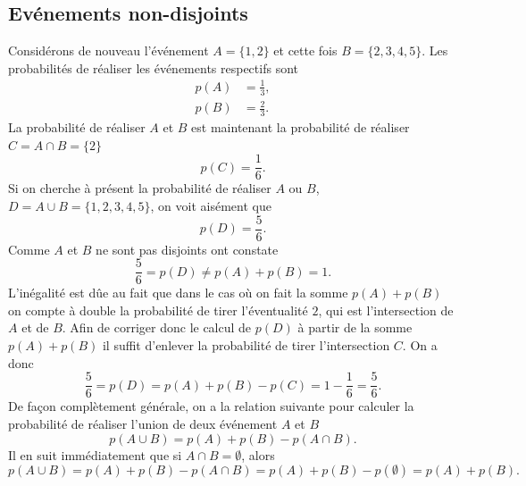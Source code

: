 \documentclass[a4paper,12pt]{book}
\begin{document}
\subsection{Evénements non-disjoints}
Considérons de nouveau l'événement $A=\{1,2\}$ et cette fois $B=\{2,3,4,5\}$. Les probabilités de réaliser les événements
respectifs sont
\begin{align}
 p(A)&=\frac{1}{3},\\
 p(B)&=\frac{2}{3}.
\end{align}
La probabilité de réaliser $A$ et $B$ est maintenant la probabilité de réaliser $C=A\cap B=\{2\}$ 
\begin{equation}
 p(C)=\frac{1}{6}.
\end{equation}
Si on cherche à présent la probabilité de réaliser $A$ ou $B$, $D=A\cup B=\{1,2,3,4,5\}$, on voit aisément que 
\begin{equation}
 p(D)=\frac{5}{6}.
\end{equation}
Comme $A$ et $B$ ne sont pas disjoints ont constate 
\begin{equation}
 \frac{5}{6}=p(D)\neq p(A)+p(B)=1.
\end{equation}
L'inégalité est dûe au fait que dans le cas où on fait la somme $p(A)+p(B)$ on compte à double la probabilité de tirer l'éventualité $2$,
qui est l'intersection de $A$ et de $B$. Afin de corriger donc le calcul de $p(D)$ à partir de la somme $p(A)+p(B)$ il suffit d'enlever 
la probabilité de tirer l'intersection $C$. On a donc
\begin{equation}
 \frac{5}{6}=p(D)= p(A)+p(B)-p(C)=1-\frac{1}{6}=\frac{5}{6}.
\end{equation}
De façon complètement générale, on a la relation suivante pour calculer la probabilité de réaliser l'union de deux événement $A$ et $B$
\begin{equation}
 p(A\cup B)=p(A)+p(B)-p(A\cap B).
\end{equation}
Il en suit immédiatement que si $A\cap B=\emptyset$, alors
\begin{equation}
 p(A\cup B)=p(A)+p(B)-p(A\cap B)=p(A)+p(B)-p(\emptyset)=p(A)+p(B).
\end{equation}
\end{document}
